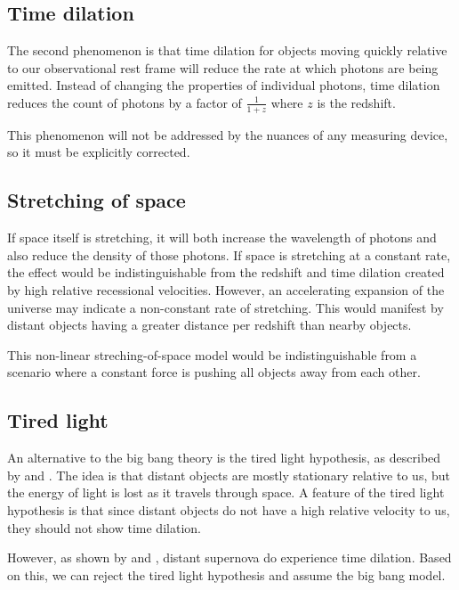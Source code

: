 \documentclass{article}
\begin{document}
\subsection{Time dilation}

The second phenomenon is that time dilation for objects moving quickly relative
to our observational rest frame will reduce the rate at which photons are being
emitted. Instead of changing the properties of individual photons, time
dilation reduces the count of photons by a factor of $\frac{1}{1+z}$ where $z$
is the redshift.

This phenomenon will not be addressed by the nuances of any measuring device,
so it must be explicitly corrected.

\subsection{Stretching of space}

If space itself is stretching, it will both increase the wavelength of photons
and also reduce the density of those photons. If space is stretching at a
constant rate, the effect would be indistinguishable from the redshift and time
dilation created by high relative recessional velocities. However, an
accelerating expansion of the universe may indicate a non-constant rate of
stretching. This would manifest by distant objects having a greater distance
per redshift than nearby objects.

This non-linear streching-of-space model would be indistinguishable from a
scenario where a constant force is pushing all objects away from each other.

\subsection{Tired light}

An alternative to the big bang theory is the tired light hypothesis, as
described by \citet{zwicky1929} and \citet{shao2013}. The idea is that distant
objects are mostly stationary relative to us, but the energy of light is lost
as it travels through space. A feature of the tired light hypothesis is that
since distant objects do not have a high relative velocity to us, they should
not show time dilation.

However, as shown by \citet{blondin2008} and \citet{white2024}, distant
supernova do experience time dilation. Based on this, we can reject the tired
light hypothesis and assume the big bang model.
\end{document}
